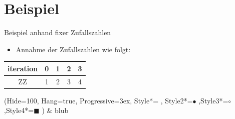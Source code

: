 \section{Beispiel}
\begin{frame}[fragile]{Beispiel anhand fixer Zufallszahlen}
\begin{itemize}
\item Annahme der Zufallszahlen wie folgt:
\end{itemize}
\begin{center}
  \begin{tabular}{c|c|c|c|c}
  \hline 
  iteration & 0 & 1 & 2 & 3\\ 
  \hline 
  ZZ      & 1 & 2 & 3 & 4 \\ 
  \end{tabular} 
\end{center}
\begin{easylist}
\ListProperties(Hide=100, Hang=true, Progressive=3ex, Style*= ,
Style2*=$\bullet$ ,Style3*=$\circ$ ,Style4*=\tiny$\blacksquare$ )
& blub
\end{easylist}
\end{frame}


